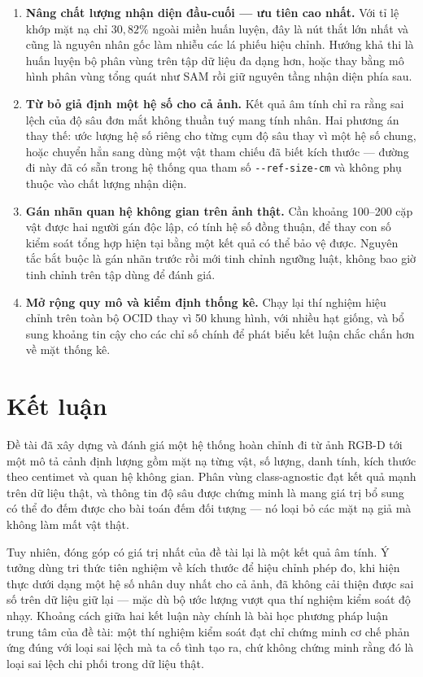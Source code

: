 \begin{enumerate}[leftmargin=1.5cm]
\item \textbf{Nâng chất lượng nhận diện đầu-cuối --- ưu tiên cao nhất.} Với tỉ lệ khớp mặt nạ chỉ
$30{,}82\%$ ngoài miền huấn luyện, đây là nút thắt lớn nhất và cũng là nguyên nhân gốc làm nhiễu
các lá phiếu hiệu chỉnh. Hướng khả thi là huấn luyện bộ phân vùng trên tập dữ liệu đa dạng hơn,
hoặc thay bằng mô hình phân vùng tổng quát như SAM \cite{kirillov2023sam} rồi giữ nguyên tầng
nhận diện phía sau.

\item \textbf{Từ bỏ giả định một hệ số cho cả ảnh.} Kết quả âm tính chỉ ra rằng sai lệch của độ
sâu đơn mắt không thuần tuý mang tính nhân. Hai phương án thay thế: ước lượng hệ số riêng cho
từng cụm độ sâu thay vì một hệ số chung, hoặc chuyển hẳn sang dùng một vật tham chiếu đã biết
kích thước --- đường đi này đã có sẵn trong hệ thống qua tham số \texttt{-{}-ref-size-cm} và
không phụ thuộc vào chất lượng nhận diện.

\item \textbf{Gán nhãn quan hệ không gian trên ảnh thật.} Cần khoảng 100--200 cặp vật được hai
người gán độc lập, có tính hệ số đồng thuận, để thay con số kiểm soát tổng hợp hiện tại bằng một
kết quả có thể bảo vệ được. Nguyên tắc bắt buộc là gán nhãn trước rồi mới tinh chỉnh ngưỡng luật,
không bao giờ tinh chỉnh trên tập dùng để đánh giá.

\item \textbf{Mở rộng quy mô và kiểm định thống kê.} Chạy lại thí nghiệm hiệu chỉnh trên toàn bộ
OCID thay vì 50 khung hình, với nhiều hạt giống, và bổ sung khoảng tin cậy cho các chỉ số chính
để phát biểu kết luận chắc chắn hơn về mặt thống kê.
\end{enumerate}

\section{Kết luận}

Đề tài đã xây dựng và đánh giá một hệ thống hoàn chỉnh đi từ ảnh RGB-D tới một mô tả cảnh định
lượng gồm mặt nạ từng vật, số lượng, danh tính, kích thước theo centimet và quan hệ không gian.
Phân vùng class-agnostic đạt kết quả mạnh trên dữ liệu thật, và thông tin độ sâu được chứng minh
là mang giá trị bổ sung có thể đo đếm được cho bài toán đếm đối tượng --- nó loại bỏ các mặt nạ
giả mà không làm mất vật thật.

Tuy nhiên, đóng góp có giá trị nhất của đề tài lại là một kết quả âm tính. Ý tưởng dùng
tri thức tiên nghiệm về kích thước để hiệu chỉnh phép đo, khi hiện thực dưới dạng một hệ số nhân
duy nhất cho cả ảnh, đã không cải thiện được sai số trên dữ liệu giữ lại --- mặc dù bộ ước lượng
vượt qua thí nghiệm kiểm soát độ nhạy. Khoảng cách giữa hai kết luận này chính là bài học phương
pháp luận trung tâm của đề tài: một thí nghiệm kiểm soát đạt chỉ chứng minh cơ chế phản ứng đúng
với loại sai lệch mà ta cố tình tạo ra, chứ không chứng minh rằng đó là loại sai lệch chi phối
trong dữ liệu thật.

